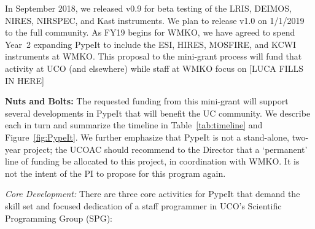 \documentclass[12pt,preprint]{aastex}
\begin{document}
In September 2018, we released v0.9 for beta testing of 
the LRIS, DEIMOS,
NIRES, NIRSPEC, and Kast instruments.
We plan to release v1.0 on 1/1/2019 to the full community.
As FY19 begins for WMKO,
we have agreed to spend Year~2 expanding PypeIt to include
the ESI, HIRES, MOSFIRE, and KCWI instruments at WMKO.
This proposal to the mini-grant process will fund
that activity at UCO (and elsewhere) while staff at WMKO
focus on 
[LUCA FILLS IN HERE]



\noindent 
{\bf Nuts and Bolts:} 
The requested funding from this mini-grant will support
several developments in PypeIt that will benefit the UC
community.  We describe each in turn and summarize the
timeline in Table~\ref{tab:timeline} and Figure~\ref{fig:PypeIt}.
We further emphasize that PypeIt is not a stand-alone,
two-year project;
the UCOAC should recommend to the Director that
a `permanent' line of funding be allocated to this
project, in coordination with WMKO.
It is not the intent of the PI to propose for this
program again.



\noindent 
{\it Core Development:} 
There are three core activities for PypeIt that demand the
skill set and focused dedication of a staff programmer
in UCO's Scientific Programming Group (SPG):

\vskip -0.15in
\end{document}
